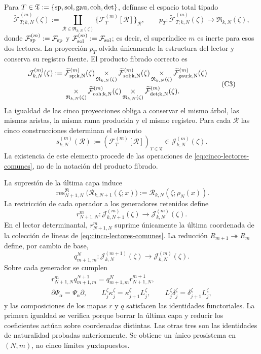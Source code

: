 Para
\(T\in\mathfrak T:=\{{\rm sp},{\rm sol},{\rm gau},{\rm coh},{\rm det}\}\),
defínase el espacio total tipado
\[
 \widetilde{\mathcal F}_{T;k,N}^{(m)}(\zeta)
 :=\coprod_{\mathscr R\in\mathfrak R_{k,N}(\zeta)}
   \{\mathcal F_T^{(m)}[\mathscr R]\}_{\mathscr R},
 \qquad
 p_T:\widetilde{\mathcal F}_{T;k,N}^{(m)}(\zeta)
      \longrightarrow\mathfrak R_{k,N}(\zeta),
\]
donde
\(\mathcal F_{\rm sp}^{(m)}:=\mathcal F_{\rm sp}\) y
\(\mathcal F_{\rm sol}^{(m)}:=\mathcal F_{\rm sol}\); es decir, el
superíndice \(m\) es inerte para esos dos lectores.
La proyección \(p_T\) olvida únicamente la estructura del lector y conserva
su registro fuente. El producto fibrado correcto es
\[
\begin{aligned}
 \mathcal J_{k,N}^{(m)}(\zeta):={}&
 \widetilde{\mathcal F}_{\rm sp;k,N}^{(m)}(\zeta)
 \mathop{\times}_{\mathfrak R_{k,N}(\zeta)}
 \widetilde{\mathcal F}_{\rm sol;k,N}^{(m)}(\zeta)
 \mathop{\times}_{\mathfrak R_{k,N}(\zeta)}
 \widetilde{\mathcal F}_{\rm gau;k,N}^{(m)}(\zeta)\\
 &\mathop{\times}_{\mathfrak R_{k,N}(\zeta)}
 \widetilde{\mathcal F}_{\rm coh;k,N}^{(m)}(\zeta)
 \mathop{\times}_{\mathfrak R_{k,N}(\zeta)}
 \widetilde{\mathcal F}_{\rm det;k,N}^{(m)}(\zeta).
\end{aligned}
\tag{C3}
\label{eq:constructor-correlativo}
\]
La igualdad de las cinco proyecciones obliga a conservar el mismo árbol, las
mismas aristas, la misma rama producida y el mismo registro. Para cada
\(\mathscr R\) las cinco construcciones determinan el elemento
\[
 s_{k,N}^{(m)}(\mathscr R)
 :=(\mathcal F_T^{(m)}[\mathscr R])_{T\in\mathfrak T}
 \in\mathcal J_{k,N}^{(m)}(\zeta).
\]
La existencia de este elemento procede de las operaciones de
\eqref{eq:cinco-lectores-comunes}, no de la
notación del producto fibrado.

La supresión de la última capa induce
\[
 \operatorname{res}^{\mathfrak R}_{N+1,N}
 \bigl(\mathscr R_{k,N+1}(\zeta;x)\bigr)
 :=\mathscr R_{k,N}(\zeta;\rho_N(x)).
\]
La restricción de cada operador a los generadores retenidos define
\[
 r^m_{N+1,N}:\mathcal J_{k,N+1}^{(m)}(\zeta)
 \longrightarrow\mathcal J_{k,N}^{(m)}(\zeta).
\]
En el lector determinantal, \(r^m_{N+1,N}\) suprime únicamente la última
coordenada de la colección de líneas de
\eqref{eq:cinco-lectores-comunes}. La reducción
\(R_{m+1}\twoheadrightarrow R_m\) define, por cambio de base,
\[
 q^N_{m+1,m}:\mathcal J_{k,N}^{(m+1)}(\zeta)
 \longrightarrow\mathcal J_{k,N}^{(m)}(\zeta).
\]
Sobre cada generador se cumplen
\[
\begin{gathered}
 r^m_{N+1,N}q^{N+1}_{m+1,m}
 =q^N_{m+1,m}r^{m+1}_{N+1,N},\\
 \partial\Psi_\alpha=\Psi_\alpha\partial,
 \qquad L_j^\zeta\kappa_j^\zeta
       =\kappa_{j+1}^\zeta L_j^\zeta,
 \qquad L_j^\zeta\delta_j^\zeta
       =\delta_{j+1}^\zeta L_j^\zeta,
\end{gathered}
\tag{C4}
\label{eq:naturalidad-D}
\]
y las composiciones de los mapas \(r\) y \(q\) satisfacen las identidades
functoriales. La primera igualdad se verifica porque borrar la última capa y
reducir los coeficientes actúan sobre coordenadas distintas. Las otras tres
son las identidades de naturalidad probadas anteriormente. Se obtiene un único
prosistema en \((N,m)\), no cinco límites yuxtapuestos.

